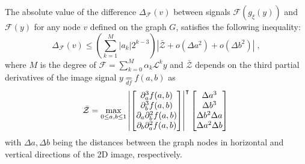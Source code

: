 \documentclass[10pt,journal,compsoc]{IEEEtran}
\newcommand{\df}{\mathop{=}\limits_{df}}
\newcommand{\norm}[1]{\left|#1\right|}
\begin{document}
	\begin{theorem}
		The absolute value of the difference $\Delta_\mathcal{F}(v)$ between signals $\mathcal{F}(g_\xi (y))$ and $\mathcal{F}(y)$ for any node $v$ defined on the graph $G$, satisfies the following inequality:
		\begin{equation}
		\Delta_\mathcal{F} (v) \leq \left( \sum_{k=1}^{M} \norm{a_k} 2^{k-3} \right) \norm{\bar{\mathcal{Z}} + o(\Delta a^2) + o(\Delta b^2)}\;,
		\label{eq:filt_diff}
		\end{equation}
		\noindent
		where $M$ is the degree of $\mathcal{F} = \sum_{k=0}^M \alpha_k \mathcal{L}^k y$ and $\bar{\mathcal{Z}}$ depends on the third partial derivatives of the image signal $y \df f(a,b)$ as
		\begin{equation}
		\bar{\mathcal{Z}} =
		\max_{0 \leq a,b \leq 1} \left|
		\begin{bmatrix}
		\partial^3_a f(a,b) \\
		\partial^3_b f(a,b) \\
		\partial_a\partial^2_b f(a,b) \\
		\partial_b\partial^2_a f(a,b) \\
		\end{bmatrix}
		\right|^{\intercal}
		\begin{bmatrix}
		\Delta a^3 \\
		\Delta b^3 \\
		\Delta b^2 \Delta a \\
		\Delta a^2 \Delta b \\
		\end{bmatrix} \\
		\label{eq:trans_z}
		\end{equation}
		\noindent
		with $\Delta a, \Delta b$ being the distances between the graph nodes in horizontal and vertical directions of the 2D image, respectively.
		\label{t:im_trans}
	\end{theorem}
\end{document}
